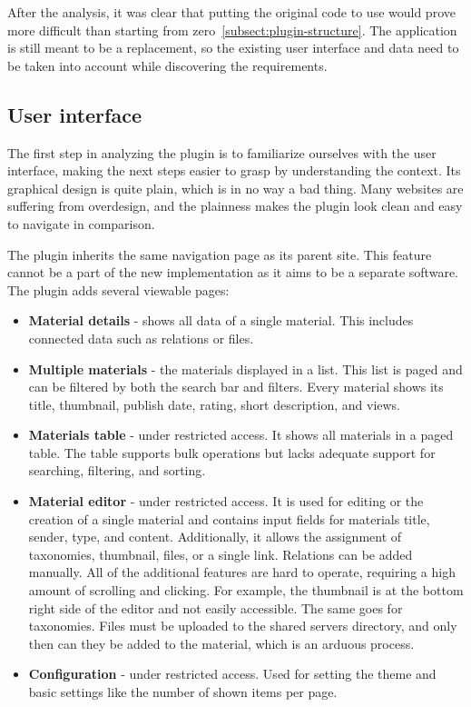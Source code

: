 \documentclass[
  digital,     %
  oneside,     %
  nosansbold,  %
  colorbold, %
  lof,         %
  lot,         %
]{fithesis4}
\begin{document}
After the analysis, it was clear that putting the original code to use would prove more difficult than starting from zero~\ref{subsect:plugin-structure}. The application is still meant to be a replacement, so the existing user interface and data need to be taken into account while discovering the requirements. 

\subsection{User interface}
\label{subsect:plugin-ui}

The first step in analyzing the plugin is to familiarize ourselves with the user interface, making the next steps easier to grasp by understanding the context. Its graphical design is quite plain, which is in no way a bad thing. Many websites are suffering from overdesign, and the plainness makes the plugin look clean and easy to navigate in comparison.

The plugin inherits the same navigation page as its parent site. This feature cannot be a part of the new implementation as it aims to be a separate software. The plugin adds several viewable pages: \begin{itemize}
	\item \textbf{Material details} - shows all data of a single material. This includes connected data such as relations or files.
	\item \textbf{Multiple materials} - the materials displayed in a list. This list is paged and can be filtered by both the search bar and filters. Every material shows its title, thumbnail, publish date, rating, short description, and views. 
	\item \textbf{Materials table} - under restricted access. It shows all materials in a paged table. The table supports bulk operations but lacks adequate support for searching, filtering, and sorting.
	\item \textbf{Material editor} - under restricted access. It is used for editing or the creation of a single material and contains input fields for materials title, sender, type, and content. Additionally, it allows the assignment of taxonomies, thumbnail, files, or a single link. Relations can be added manually. All of the additional features are hard to operate, requiring a high amount of scrolling and clicking. For example, the thumbnail is at the bottom right side of the editor and not easily accessible. The same goes for taxonomies. Files must be uploaded to the shared servers directory, and only then can they be added to the material, which is an arduous process.
	\item \textbf{Configuration} - under restricted access. Used for setting the theme and basic settings like the number of shown items per page.
\end{itemize}
\end{document}
